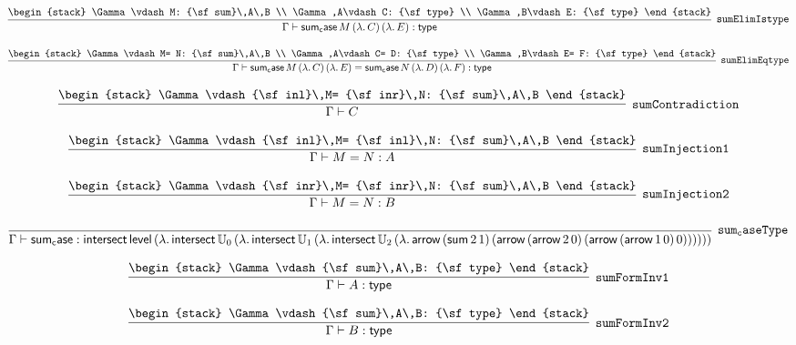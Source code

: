 \[
\infer[{\tt sumElimIstype}]{\Gamma \vdash {\sf sum_case}\,M\,(\lambda .\,C)\,(\lambda .\,E): {\sf type}}{
\begin{stack}
\Gamma \vdash M: {\sf sum}\,A\,B
\\
\Gamma ,A\vdash C: {\sf type}
\\
\Gamma ,B\vdash E: {\sf type}
\end{stack}}
\]

\[
\infer[{\tt sumElimEqtype}]{\Gamma \vdash {\sf sum_case}\,M\,(\lambda .\,C)\,(\lambda .\,E)= {\sf sum_case}\,N\,(\lambda .\,D)\,(\lambda .\,F): {\sf type}}{
\begin{stack}
\Gamma \vdash M= N: {\sf sum}\,A\,B
\\
\Gamma ,A\vdash C= D: {\sf type}
\\
\Gamma ,B\vdash E= F: {\sf type}
\end{stack}}
\]

\[
\infer[{\tt sumContradiction}]{\Gamma \vdash C}{
\begin{stack}
\Gamma \vdash {\sf inl}\,M= {\sf inr}\,N: {\sf sum}\,A\,B
\end{stack}}
\]

\[
\infer[{\tt sumInjection1}]{\Gamma \vdash M= N: A}{
\begin{stack}
\Gamma \vdash {\sf inl}\,M= {\sf inl}\,N: {\sf sum}\,A\,B
\end{stack}}
\]

\[
\infer[{\tt sumInjection2}]{\Gamma \vdash M= N: B}{
\begin{stack}
\Gamma \vdash {\sf inr}\,M= {\sf inr}\,N: {\sf sum}\,A\,B
\end{stack}}
\]

\[
\infer[{\tt sum_caseType}]{\Gamma \vdash {\sf sum_case}: {\sf intersect}\,{\sf level}\,(\lambda .\,{\sf intersect}\,{\Bbb U}_{0}\,(\lambda .\,{\sf intersect}\,{\Bbb U}_{1}\,(\lambda .\,{\sf intersect}\,{\Bbb U}_{2}\,(\lambda .\,{\sf arrow}\,({\sf sum}\,2\,1)\,({\sf arrow}\,({\sf arrow}\,2\,0)\,({\sf arrow}\,({\sf arrow}\,1\,0)\,0))))))}{}
\]

\[
\infer[{\tt sumFormInv1}]{\Gamma \vdash A: {\sf type}}{
\begin{stack}
\Gamma \vdash {\sf sum}\,A\,B: {\sf type}
\end{stack}}
\]

\[
\infer[{\tt sumFormInv2}]{\Gamma \vdash B: {\sf type}}{
\begin{stack}
\Gamma \vdash {\sf sum}\,A\,B: {\sf type}
\end{stack}}
\]

